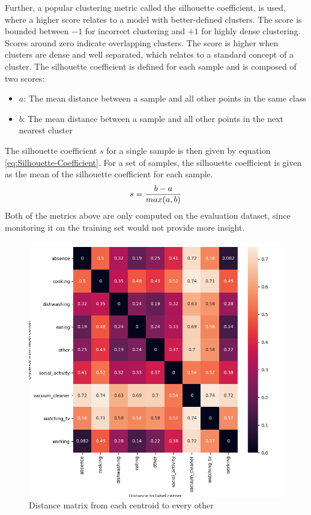 \newline
\newline
Further, a popular clustering metric called the silhouette coefficient, is used, where a higher score relates to a model with better-defined clusters. The score is bounded between $-1$ for incorrect clustering and $+1$ for highly dense clustering. Scores around zero indicate overlapping clusters. The score is higher when clusters are dense and well separated, which relates to a standard concept of a cluster. The silhouette coefficient is defined for each sample and is composed of two scores:
\begin{itemize}
\setlength\itemsep{0em}
    \item $a$: The mean distance between a sample and all other points in the same class
    \item $b$: The mean distance between a sample and all other points in the next nearest cluster
\end{itemize}
The silhouette coefficient $s$ for a single sample is then given by equation \ref{eq:Silhouette-Coefficient}. For a set of samples, the silhouette coefficient is given as the mean of the silhouette coefficient for each sample.
\begin{equation}
    \centering
    \begin{gathered}
        s = \frac{b - a}{max(a, b)}
    \end{gathered}
    \label{eq:Silhouette-Coefficient}
\end{equation}
Both of the metrics above are only computed on the evaluation dataset, since monitoring it on the training set would not provide more insight.
\begin{figure}[htbp]
	\centering
	\includegraphics[scale=0.3]{img/Distance_Metric.png}
	\caption{Distance matrix from each centroid to every other}
	\label{fig:Distance-Matrix}
\end{figure}


